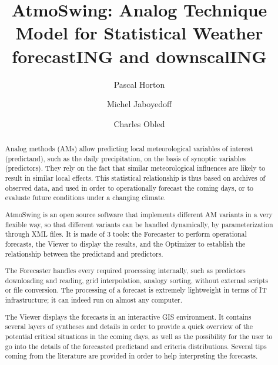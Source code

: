 \documentclass[review]{elsarticle}
\begin{document}
\begin{frontmatter}

\title{AtmoSwing: Analog Technique Model for Statistical Weather forecastING and downscalING}


\author[unibe,unil,terranum]{Pascal Horton}

\author[unil]{Michel Jaboyedoff}
\author[grenoble]{Charles Obled}

\address[unibe]{University of Bern, Oeschger Centre for Climate Change Research, Institute of Geography, Bern, Switzerland}
\address[unil]{University of Lausanne, Institute of Earth Sciences, Lausanne, Switzerland}
\address[terranum]{Terranum SARL, Bussigny, Switzerland}
\address[grenoble]{Universit\'{e} de Grenoble-Alpes, LTHE, Grenoble, France}



\begin{abstract}
Analog methods (AMs) allow predicting local meteorological variables of interest (predictand), such as the daily precipitation, on the basis of synoptic variables (predictors). They rely on the fact that similar meteorological influences are likely to result in similar local effects. This statistical relationship is thus based on archives of observed data, and used in order to operationally forecast the coming days, or to evaluate future conditions under a changing climate.

AtmoSwing is an open source software that implements different AM variants in a very flexible way, so that different variants can be handled dynamically, by parameterization through XML files. It is made of 3 tools: the Forecaster to perform operational forecasts, the Viewer to display the results, and the Optimizer to establish the relationship between the predictand and predictors. 

The Forecaster handles every required processing internally, such as predictors downloading and reading, grid interpolation, analogy sorting, without external scripts or file conversion. The processing of a forecast is extremely lightweight in terms of IT infrastructure; it can indeed run on almost any computer.

The Viewer displays the forecasts in an interactive GIS environment. It contains several layers of syntheses and details in order to provide a quick overview of the potential critical situations in the coming days, as well as the possibility for the user to go into the details of the forecasted predictand and criteria distributions. Several tips coming from the literature are provided in order to help interpreting the forecasts.


\end{abstract}
\end{frontmatter}
\end{document}
